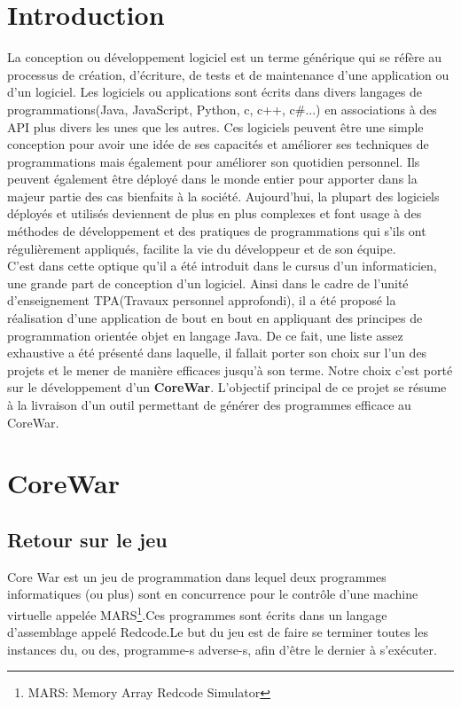 \documentclass[12pt]{article}
\begin{document}
\tableofcontents

\section{Introduction}
La conception ou développement logiciel est un terme générique qui se réfère au processus de création, d'écriture, de tests et de maintenance d'une application ou d'un logiciel. Les logiciels ou applications sont écrits dans divers langages de programmations(Java, JavaScript, Python, c, c++, c\#...) en associations à des API plus divers les unes que les autres. Ces logiciels peuvent être une simple conception pour avoir une idée de ses capacités et améliorer ses techniques de programmations mais également pour améliorer son quotidien personnel. Ils peuvent également être déployé dans le monde entier pour apporter dans la majeur partie des cas bienfaits à la société. Aujourd'hui, la plupart des logiciels déployés et utilisés deviennent de plus en plus complexes et font usage à des méthodes de développement et des pratiques de programmations qui s'ils ont régulièrement appliqués, facilite la vie du développeur et de son équipe.\\

C'est dans cette optique qu'il a été introduit dans le cursus d'un informaticien, une grande part de conception d'un logiciel. Ainsi dans le cadre de l'unité d'enseignement TPA(Travaux personnel approfondi), il a été proposé la réalisation d'une application de bout en bout en appliquant des principes de programmation orientée objet en langage Java. De ce fait, une liste assez exhaustive a été présenté dans laquelle, il fallait porter son choix sur l'un des projets et le mener de manière efficaces jusqu'à son terme. Notre choix c'est porté sur le développement d'un \textbf{CoreWar}. L'objectif principal de ce projet se résume à la livraison d'un outil permettant de générer des programmes efficace au CoreWar.

\newpage
\section{CoreWar}
\subsection{Retour sur le jeu}
Core War est un jeu de programmation dans lequel deux programmes informatiques (ou plus) sont en concurrence pour le contrôle d'une machine virtuelle appelée MARS\footnote{MARS: Memory Array Redcode Simulator}.Ces programmes sont écrits dans un langage d'assemblage appelé Redcode.Le but du jeu est de faire se terminer toutes les instances du, ou des, programme-s adverse-s, afin d'être le dernier à s'exécuter.
\end{document}
